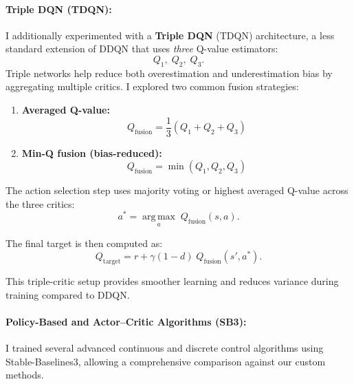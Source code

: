 \documentclass[10pt,twocolumn]{article}
\begin{document}
\vspace{0.7em}

\paragraph*{Triple DQN (TDQN):}
I additionally experimented with a \textbf{Triple DQN} (TDQN) architecture, a less standard extension of DDQN that uses \emph{three} Q-value estimators:
\[
Q_1,\; Q_2,\; Q_3.
\]
Triple networks help reduce both overestimation and underestimation bias by aggregating multiple critics.  
I explored two common fusion strategies:

\begin{enumerate}
    \item \textbf{Averaged Q-value:}
    \[
    Q_{\text{fusion}} = \frac{1}{3}\left(Q_1 + Q_2 + Q_3\right)
    \]
    \item \textbf{Min-Q fusion (bias-reduced):}
    \[
    Q_{\text{fusion}} = \min(Q_1, Q_2, Q_3)
    \]
\end{enumerate}

The action selection step uses majority voting or highest averaged Q-value across the three critics:
\[
a^{*} = \operatorname*{arg\,max}_{a}\; Q_{\text{fusion}}(s,a).
\]

The final target is then computed as:
\[
Q_{\text{target}} 
= r + \gamma(1-d)\;
Q_{\text{fusion}}\!\left({s'}, a^{*}\right).
\]

This triple-critic setup provides smoother learning and reduces variance during training compared to DDQN.

\vspace{0.7em}

\paragraph*{Policy-Based and Actor--Critic Algorithms (SB3):}
I trained several advanced continuous and discrete control algorithms using 
Stable-Baselines3, allowing a comprehensive comparison against our custom methods.
\end{document}
